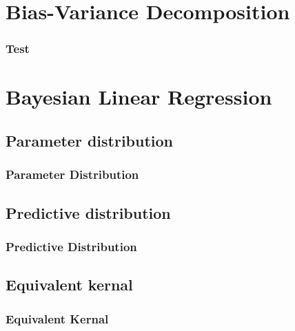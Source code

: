 \documentclass{beamer}
\begin{document}
\section{Bias-Variance Decomposition} %

\begin{frame}
\frametitle{Test}


\end{frame}


\section{Bayesian Linear Regression} %


\subsection{Parameter distribution}

\begin{frame}
\frametitle{Parameter Distribution}


\end{frame}

\subsection{Predictive distribution}

\begin{frame}
\frametitle{Predictive Distribution}

\end{frame}


\subsection{Equivalent kernal}

\begin{frame}
\frametitle{Equivalent Kernal}

\end{frame}
\end{document}
